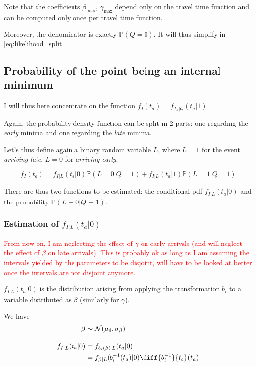 \documentclass{article}
\begin{document}
Note that the coefficients \(\beta_\text{max}\), \(\gamma_\text{max}\) depend only on the travel time function and can be computed only once per travel time function.

Moreover, the denominator is exactly \(\mathbb{P}(Q = 0)\).
It will thus simplify in \eqref{eq:likelihood_split}

\subsection{Probability of the point being an internal minimum}

I will thus here concentrate on the function \(f_I(t_a) = f_{T_a | Q}(t_a | 1)\).

Again, the probability density function can be split in 2 parts:
one regarding the \textit{early} minima and one regarding the \textit{late} minima.

Let's thus define again a binary random variable \(L\), where \(L=1\) for the event \textit{arriving late}, \(L=0\) for \textit{arriving early}.

\begin{equation}
  \label{eq:internal_split}
  f_I(t_a) = f_{I | L}(t_a | 0) \mathbb{P}(L=0 | Q=1) + f_{I | L}(t_a | 1) \mathbb{P}(L=1 | Q=1)
\end{equation}

There are thus two functions to be estimated:
the conditional pdf \(f_{I | L}(t_a | 0)\) and the probability \(\mathbb{P}(L=0 | Q=1)\).

\subsubsection{Estimation of $f_{I | L}(t_a | 0)$}

\textcolor{red}{From now on, I am neglecting the effect of $\gamma$ on early arrivals (and will neglect the effect of $\beta$ on late arrivals). This is probably ok as long as I am assuming the intervals yielded by the parameters to be disjoint, will have to be looked at better once the intervals are not disjoint anymore.}

\(f_{I | L}(t_a | 0)\) is the distribution arising from applying the transformation \(b_i\) to a variable distributed as \(\beta\) (similarly for \(\gamma\)).

We have
\begin{align}
  \label{eq:pdf_bi}
  \begin{split}
    \beta & \sim \mathcal{N}(\mu_\beta, \sigma_\beta) \\[1em]
    f_{I | L}(t_a | 0) & = f_{b_i(\beta) | L}(t_a | 0) \\
    & = f_{\beta | L}(b_i^{-1}(t_a) | 0)\diff{b_i^{-1}}{t_a}(t_a)
  \end{split}
\end{align}
\end{document}
